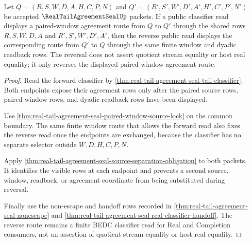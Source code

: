 \begin{theorem}
\label{thm:real-tail-agreement-seal-classifier-symmetry}
Let $Q=(R,S,W,D,A,H,C,P,N)$ and $Q'=(R',S',W',D',A',H',C',P',N')$ be accepted $\RealTailAgreementSealUp$ packets. If a public classifier read displays a paired-window agreement route from $Q$ to $Q'$ through the shared rows $R,S,W,D,A$ and $R',S',W',D',A'$, then the reverse public read displays the corresponding route from $Q'$ to $Q$ through the same finite window and dyadic readback rows. The reversal does not assert quotient stream equality or host real equality; it only reverses the displayed paired-window agreement route.
\end{theorem}
\begin{proof}
Read the forward classifier by \autoref{thm:real-tail-agreement-seal-tail-classifier}. Both endpoints expose their agreement rows only after the paired source rows, paired window rows, and dyadic readback rows have been displayed.

Use \autoref{thm:real-tail-agreement-seal-paired-window-source-lock} on the common boundary. The same finite window route that allows the forward read also fixes the reverse read once the endpoints are exchanged, because the classifier has no separate selector outside $W,D,H,C,P,N$.

Apply \autoref{thm:real-tail-agreement-seal-source-separation-obligation} to both packets. It identifies the visible rows at each endpoint and prevents a second source, window, readback, or agreement coordinate from being substituted during reversal.

Finally use the non-escape and handoff rows recorded in \autoref{thm:real-tail-agreement-seal-nonescape} and \autoref{thm:real-tail-agreement-seal-real-classifier-handoff}. The reverse route remains a finite BEDC classifier read for Real and Completion consumers, not an assertion of quotient stream equality or host real equality.
\end{proof}

